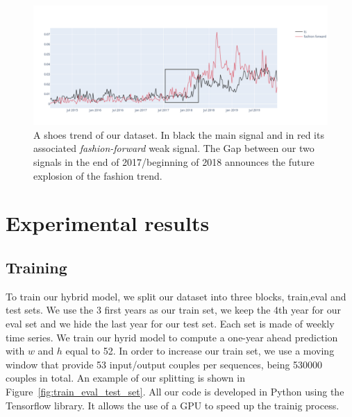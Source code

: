 \documentclass{article} %
\newcommand{\lag}{h}
\newcommand{\window}{w}
\begin{document}
\begin{figure}
  \centering
    \includegraphics[width=1.\linewidth]{figure/emergering_trend.png}
  \caption{A shoes trend of our dataset. In black the main signal and in red its associated \textit{fashion-forward} weak signal. The Gap between our two signals in the end of 2017/beginning of 2018 announces the future explosion of the fashion trend.}
\label{fig:oneemergingtrend}
\end{figure}





\section{Experimental results}
\label{sec:exp}

\subsection{Training}

To train our hybrid model, we split our dataset into three blocks, train,eval and test sets. We use the 3 first years as our train set, we keep the 4th year for our eval set and we hide the last year for our test set. Each set is made of weekly time series. We train our hyrid model to compute a one-year ahead prediction with $\window$ and $\lag$ equal to 52. In order to increase our train set, we use a moving window that provide 53 input/output couples per sequences, being 530000 couples in total. An example of our splitting is shown in  Figure~\ref{fig:train_eval_test_set}. All our code is developed in Python using the Tensorflow library. It allows the use of a GPU to speed up the trainig process.
\end{document}
